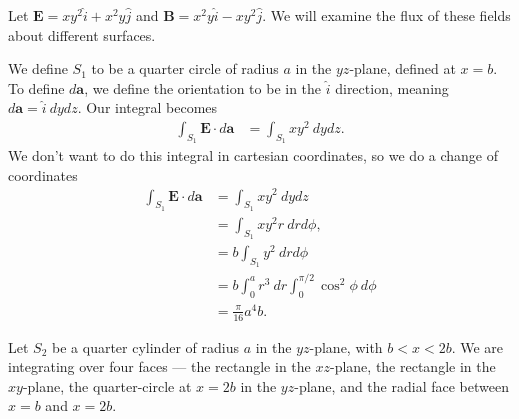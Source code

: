 \documentclass[10pt]{mypackage}
\begin{document}
\begin{example}
  Let $\mathbf{E} = xy^2\hat{i} + x^2y\hat{j}$ and $\mathbf{B} = x^2y\hat{i} - xy^2\hat{j}$. We will examine the flux of these fields about different surfaces.
  \begin{example}
    We define $S_1$ to be a quarter circle of radius $a$ in the $yz$-plane, defined at $x=b$. To define $d\mathbf{a}$, we define the orientation to be in the $\hat{i}$ direction, meaning $d\mathbf{a} = \hat{i}\:dydz$. Our integral becomes
    \begin{align*}
      \int_{S_1}^{} \mathbf{E}\cdot d\mathbf{a} &= \int_{S_1}^{} xy^2\:dydz.
    \end{align*}
    We don't want to do this integral in cartesian coordinates, so we do a change of coordinates
    \begin{align*}
      \int_{S_1}^{} \mathbf{E}\cdot d\mathbf{a} &= \int_{S_1}^{} xy^2\:dydz\\
                                                &= \int_{S_1}^{} xy^2 r\:dr d\phi,\\
                                                &= b\int_{S_1}^{} y^2\:dr d\phi\\
                                                &= b\int_{0}^{a}r^3\:dr\int_{0}^{\pi/2}\cos^2\phi\:d\phi\\
                                                &=\frac{\pi}{16}a^4b.
    \end{align*}
  \end{example}
  \begin{example}
    Let $S_2$ be a quarter cylinder of radius $a$ in the $yz$-plane, with $b < x < 2b$. We are integrating over four faces --- the rectangle in the $xz$-plane, the rectangle in the $xy$-plane, the quarter-circle at $x = 2b$ in the $yz$-plane, and the radial face between $x=b$ and $x=2b$.\newline


\end{example}
\end{example}
\end{document}
